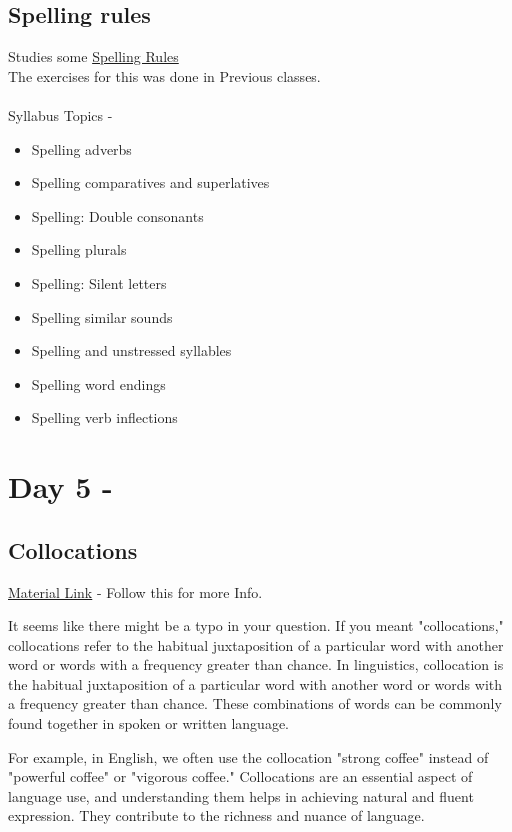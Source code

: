 \documentclass[a4paper,30pt]{report}
\begin{document}
    \section{Spelling rules}
      Studies some \href{https://www.awelu.lu.se/language/spelling/english-spelling-rules/?authuser=1}{Spelling Rules}\\
      The exercises for this was done in Previous classes. \\\\
      Syllabus Topics - 
      \begin{itemize}
        \item Spelling adverbs
        \item Spelling comparatives and superlatives
        \item Spelling: Double consonants
        \item Spelling plurals
        \item Spelling: Silent letters
        \item Spelling similar sounds
        \item Spelling and unstressed syllables
        \item Spelling word endings
        \item Spelling verb inflections
      \end{itemize}
      
  \chapter{Day 5 - }
    \section{Collocations}
      \href{https://www.englishclub.com/vocabulary/collocations.php}{Material Link} - Follow this for more Info.
      \par It seems like there might be a typo in your question. If you meant "collocations," collocations refer to the habitual juxtaposition of a particular word with another word or words with a frequency greater than chance. In linguistics, collocation is the habitual juxtaposition of a particular word with another word or words with a frequency greater than chance. These combinations of words can be commonly found together in spoken or written language.
      \par For example, in English, we often use the collocation "strong coffee" instead of "powerful coffee" or "vigorous coffee." Collocations are an essential aspect of language use, and understanding them helps in achieving natural and fluent expression. They contribute to the richness and nuance of language.\\\\
      
\end{document}
